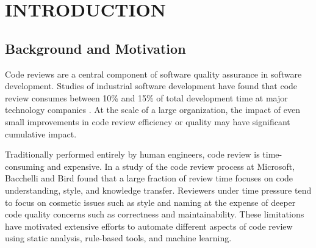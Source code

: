 \documentclass[12pt]{report}
\newif\ifarabicpagenums
\newcommand{\MainMatterStyle}{%
  \arabicpagenumstrue
  \pagestyle{empty}%
  \fancypagestyle{plain}{\pagestyle{empty}}%
}
\begin{document}
\thispagestyle{fancy}
\begin{singlespace}
\listoftables
\end{singlespace}
\clearpage

\MainMatterStyle

\chapter{INTRODUCTION}

\section{Background and Motivation}

Code reviews are a central component of software quality assurance in software development. Studies of industrial software development have found that code review consumes between 10\% and 15\% of total development time at major technology companies \cite{sadowski2018modern, bacchelli2013expectations}. At the scale of a large organization, the impact of even small improvements in code review efficiency or quality may have significant cumulative impact.

Traditionally performed entirely by human engineers, code review is time-consuming and expensive. In a study of the code review process at Microsoft, Bacchelli and Bird \cite{bacchelli2013expectations} found that a large fraction of review time focuses on code understanding, style, and knowledge transfer. Reviewers under time pressure tend to focus on cosmetic issues such as style and naming at the expense of deeper code quality concerns such as correctness and maintainability. These limitations have motivated extensive efforts to automate different aspects of code review using static analysis, rule-based tools, and machine learning.
\end{document}
